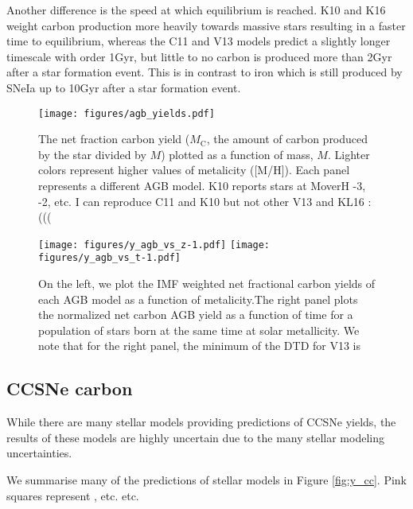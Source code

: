 \documentclass[fleqn,usenatbib]{mnras}
\begin{document}
Another difference is the speed at which equilibrium is reached. K10 and K16 weight carbon production more heavily towards massive stars resulting in a faster time to equilibrium, whereas the C11 and V13 models predict a slightly longer timescale with order 1Gyr, but little to no carbon is produced more than 2Gyr after a star formation event. This is in contrast to iron which is still produced by SNeIa up to 10Gyr after a star formation event. 

\begin{figure*}
    \centering
 	    \texttt{[image: figures/agb\_yields.pdf]}\\

    \caption{The net fraction carbon yield ($M_\text{C}$, the amount of carbon produced by the star divided by $M$) plotted as a function of mass, $M$. Lighter colors represent higher values of metalicity ([M/H]). Each panel represents a different AGB model. K10 reports stars at MoverH -3, -2, etc. I can reproduce C11 and K10 but not other V13 and KL16 :(((}

    \label{fig:y_agb}
\end{figure*}

\begin{figure*}
    \centering
    
    \texttt{[image: figures/y\_agb\_vs\_z-1.pdf]}
    \texttt{[image: figures/y\_agb\_vs\_t-1.pdf]}

    \caption{On the left, we plot the IMF weighted net fractional carbon yields of each AGB model as a function of metalicity.The right panel plots the normalized net carbon AGB yield as a function of time for a population of stars born at the same time at solar metallicity. We note that for the right panel, the minimum of the DTD for V13 is }

\end{figure*}

\subsection{CCSNe carbon}

While there are many stellar models providing predictions of CCSNe yields, the results of these models are highly uncertain due to the many stellar modeling uncertainties. 

We summarise many of the predictions of stellar models in Figure \ref{fig:y_cc}. Pink squares represent \citep{2013ARA&A..51..457N}, etc. etc.
\citep{2018ApJS..237...13L}
\citep{2016ApJ...821...38S}
\citep{1995ApJS..101..181W}
\end{document}
